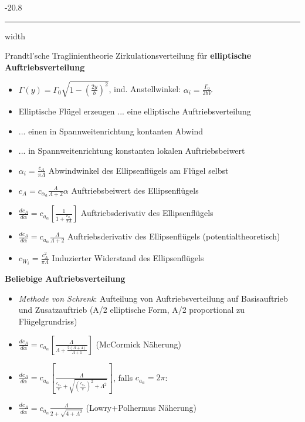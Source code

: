 \documentclass[8pt, landscape, fleqn]{scrartcl}
\makeatletter
\renewcommand{\subsubsection}{\@startsection{subsubsection}{1}{0mm}%
{-2\baselineskip}{0.8\baselineskip}%
{\hrule depth 0.2pt width\columnwidth\vspace*{1.2em}\normalsize\bfseries\rmfamily}}
\makeatother
\begin{document}
\begin{multicols*}{3}
\subsubsection{Prandtl'sche Traglinientheorie}
Zirkulationsverteilung für \textbf{elliptische Auftriebsverteilung}
\begin{itemize}
    \item $\Gamma(y) = \Gamma_0 \sqrt{1-\left(\frac{2y}{b}\right)^2}$, ind. Anstellwinkel: $\alpha_i = \frac{\Gamma_0}{2bV}$
    \item Elliptische Flügel erzeugen ... eine elliptische Auftriebsverteilung 
    \item ... einen in Spannweitenrichtung kontanten Abwind
    \item ... in Spannweitenrichtung konstanten lokalen Auftriebsbeiwert
    \item $\alpha_i = \frac{c_A}{\pi \Lambda}$ Abwindwinkel des Ellipsenflügels am Flügel selbst
    \item $c_A = c_{\alpha_a}\frac{\Lambda}{\Lambda+2}\alpha$ Auftriebsbeiwert des Ellipsenflügels
    \item $\frac{d c_A}{d \alpha} = c_{a_\alpha}\left[\frac{1}{1+\frac{c_{a_\alpha}}{\pi \Lambda}}\right]$ Auftriebsderivativ des Ellipsenflügels
    \item $\frac{d c_A}{d \alpha} = c_{a_\alpha}\frac{\Lambda}{\Lambda+2}$ Auftriebsderivativ des Ellipsenflügels (potentialtheoretisch)
    \item $c_{W_i}=\frac{c_A^2}{\pi \Lambda}$ Induzierter Widerstand des Ellipsenflügels
\end{itemize}
\textbf{Beliebige Auftriebsverteilung}
\begin{itemize}
    \item \emph{Methode von Schrenk}: Aufteilung von Auftriebsverteilung auf Basisauftrieb und Zusatzauftrieb (A/2 elliptische Form, A/2 proportional zu Flügelgrundriss)
    \item $\frac{dc_A}{d\alpha} = c_{a_\alpha}\left[\frac{\Lambda}{\Lambda+\frac{2(\Lambda+4)}{\Lambda+1}}\right]$ (McCormick Näherung)
    \item $\frac{dc_A}{d\alpha} = c_{a_\alpha}\left[\frac{\Lambda}{\frac{c_{a_\alpha}}{\pi}+\sqrt{\left(\frac{c_{a_\alpha}}{\pi}\right)^2+\Lambda^2}}\right]$, falls $c_{a_\alpha} = 2 \pi $:
    \item $\frac{dc_A}{d\alpha} = c_{a_\alpha}\frac{\Lambda}{2+\sqrt{4+\Lambda^2}}$ (Lowry+Polhermus Näherung)
\end{itemize}


\end{multicols*}
\end{document}
